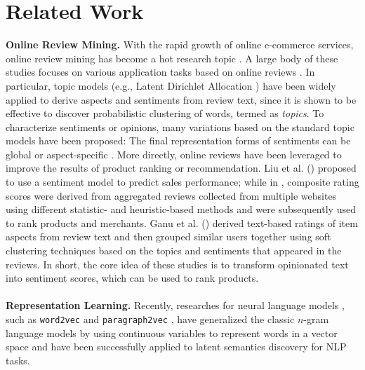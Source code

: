 \section{Related Work} \label{sec:rel}


\noindent \textbf{Online Review Mining.} With the rapid growth of online e-commerce services, online review mining has become a hot research topic \cite{Pang+Lee:08b}. A large body of these studies focuses on various application tasks based on online reviews \cite{Jindal+Liu:08a,Archak+Ghose+Ipeirotis:07a,Branavan+al:08a,Breck+Choi+Cardie:07a}. In particular, topic models  (e.g., Latent Dirichlet Allocation \cite{blei:jmlr03}) have been widely applied to derive aspects and sentiments from review text, since it is shown to be effective to discover probabilistic clustering of words, termed as \emph{topics}. To characterize sentiments or opinions, many variations based on the standard topic models have been proposed: The final representation forms of sentiments can be global \cite{Mei+al:07a,Hu+Liu:04b} or aspect-specific \cite{zhao-EtAl:2010:EMNLP,xu-cikm-2012}. More directly, online reviews have been leveraged to improve the results of product ranking or recommendation. Liu et al. (\cite{Liu+al:07b}) proposed to use a sentiment model to predict sales performance; while in \cite{mcglohon-icwsm-2010}, composite rating scores were derived from aggregated reviews collected from multiple websites using different statistic- and heuristic-based methods and were subsequently used to rank products and merchants. Ganu et al. (\cite{ganu2009beyond,Ganu:2013:IQP}) derived text-based ratings of item aspects from review text and then grouped similar users together using soft clustering techniques based on the topics and sentiments that appeared in the reviews. In short, the core idea of these studies is to transform opinionated text into sentiment scores, which can be used to rank products.
\\
\\
\noindent \textbf{Representation Learning.} Recently, researches for neural language models \cite{nlm}, such as \texttt{word2vec} \cite{word_to_vector} and \texttt{paragraph2vec} \cite{paragraph_vector}, have generalized the classic $n$-gram language models by using continuous variables to represent words in a vector space and have been successfully applied to latent semantics discovery for NLP tasks. 
